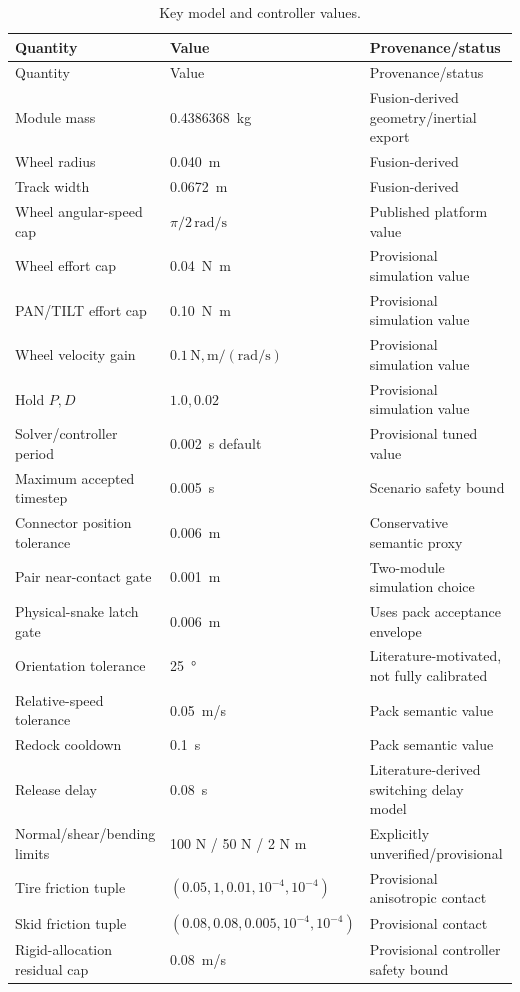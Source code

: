 \begin{longtable}{L{0.33\textwidth}L{0.22\textwidth}L{0.31\textwidth}}
\caption{Key \smoresep{} model and controller values.}
\label{tab:parameter-provenance}\\
\toprule
Quantity & Value & Provenance/status \\
\midrule
\endfirsthead
\toprule
Quantity & Value & Provenance/status \\
\midrule
\endhead
Module mass & \SI{0.4386368}{kg} & Fusion-derived geometry/inertial export \\
Wheel radius & \SI{0.040}{m} & Fusion-derived \\
Track width & \SI{0.0672}{m} & Fusion-derived \\
Wheel angular-speed cap & $\pi/2\,\mathrm{rad/s}$ & Published platform value \\
Wheel effort cap & \SI{0.04}{N.m} & Provisional simulation value \\
PAN/TILT effort cap & \SI{0.10}{N.m} & Provisional simulation value \\
Wheel velocity gain & $0.1\,\mathrm{N,m/(rad/s)}$ & Provisional simulation value \\
Hold $P,D$ & $1.0,0.02$ & Provisional simulation value \\
Solver/controller period & \SI{0.002}{s} default & Provisional tuned value \\
Maximum accepted timestep & \SI{0.005}{s} & Scenario safety bound \\
Connector position tolerance & \SI{0.006}{m} & Conservative semantic proxy \\
Pair near-contact gate & \SI{0.001}{m} & Two-module simulation choice \\
Physical-snake latch gate & \SI{0.006}{m} & Uses pack acceptance envelope \\
Orientation tolerance & \SI{25}{\degree} & Literature-motivated, not fully calibrated \\
Relative-speed tolerance & \SI{0.05}{m/s} & Pack semantic value \\
Redock cooldown & \SI{0.1}{s} & Pack semantic value \\
Release delay & \SI{0.08}{s} & Literature-derived switching delay model \\
Normal/shear/bending limits & 100 N / 50 N / 2 N m & Explicitly unverified/provisional \\
Tire friction tuple & $(0.05,1,0.01,10^{-4},10^{-4})$ & Provisional anisotropic contact \\
Skid friction tuple & $(0.08,0.08,0.005,10^{-4},10^{-4})$ & Provisional contact \\
Rigid-allocation residual cap & \SI{0.08}{m/s} & Provisional controller safety bound \\
\bottomrule
\end{longtable}


